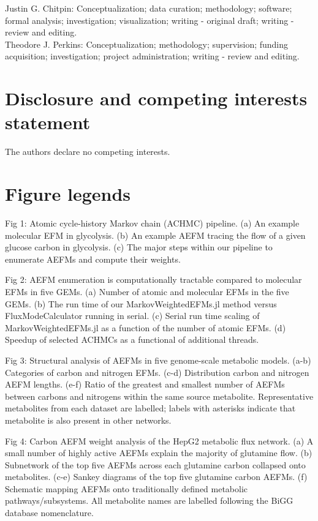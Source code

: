 \documentclass[12pt]{article}
\begin{document}
Justin G. Chitpin: Conceptualization; data curation; methodology; software; formal analysis; investigation; visualization; writing - original draft; writing - review and editing.\\

\noindent Theodore J. Perkins: Conceptualization; methodology; supervision; funding acquisition; investigation; project administration; writing - review and editing.

\section*{Disclosure and competing interests statement}

The authors declare no competing interests.



\section*{Figure legends}

\noindent Fig 1: Atomic cycle-history Markov chain (ACHMC) pipeline. (a) An
example molecular EFM in glycolysis. (b) An example AEFM tracing the flow
of a given glucose carbon in glycolysis. (c) The major steps within our
pipeline to enumerate AEFMs and compute their weights.

\noindent Fig 2: AEFM enumeration is computationally tractable
compared to molecular EFMs in five GEMs. (a) Number of atomic and
molecular EFMs in the five GEMs. (b) The run time of our
MarkovWeightedEFMs.jl method versus FluxModeCalculator running in serial.
(c) Serial run time scaling of MarkovWeightedEFMs.jl as a function of the
number of atomic EFMs. (d) Speedup of selected ACHMCs as a functional of
additional threads.

\noindent Fig 3: Structural analysis of AEFMs in five genome-scale
metabolic models. (a-b) Categories of carbon and nitrogen EFMs. (c-d)
Distribution carbon and nitrogen AEFM lengths. (e-f) Ratio of the greatest
and smallest number of AEFMs between carbons and nitrogens within the same
source metabolite. Representative metabolites from each dataset are
labelled; labels with asterisks indicate that metabolite is also present
in other networks.

\noindent Fig 4: Carbon AEFM weight analysis of the HepG2 metabolic
flux network. (a) A small number of highly active AEFMs explain the
majority of glutamine flow. (b) Subnetwork of the top five AEFMs across
each glutamine carbon collapsed onto metabolites. (c-e) Sankey diagrams of
the top five glutamine carbon AEFMs. (f) Schematic mapping AEFMs onto
traditionally defined metabolic pathways/subsystems. All metabolite names are
labelled following the BiGG database nomenclature.
\end{document}

